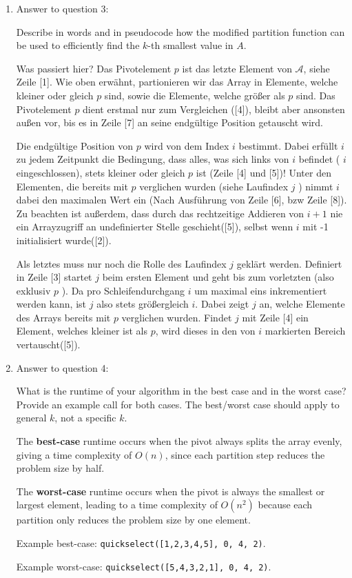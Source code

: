 \documentclass[11pt]{article}
\begin{document}
\begin{enumerate}
	\item Answer to question 3:

	      Describe in words and in pseudocode how the modified partition function can be used to efficiently find the $k$-th smallest value in $A$.

	      Was passiert hier? Das Pivotelement $p$ ist das letzte Element von $\mathcal{A}$, siehe Zeile [1]. Wie oben erwähnt, partionieren wir das Array in Elemente, welche kleiner oder gleich $p$ sind, sowie die Elemente, welche größer als $p$ sind. Das Pivotelement $p$ dient erstmal nur zum Vergleichen ([4]), bleibt aber ansonsten außen vor, bis es in Zeile [7] an seine endgültige Position getauscht wird.

	      Die endgültige Position von $p$ wird von dem Index $i$ bestimmt. Dabei erfüllt $i$ zu jedem Zeitpunkt die Bedingung, dass alles, was sich links von $i$ befindet ( $i$ eingeschlossen), stets kleiner oder gleich $p$ ist (Zeile [4] und [5])! Unter den Elementen, die bereits mit $p$ verglichen wurden (siehe Laufindex $j$ ) nimmt $i$ dabei den maximalen Wert ein (Nach Ausführung von Zeile [6], bzw Zeile [8]). Zu beachten ist außerdem, dass durch das rechtzeitige Addieren von $i+1$ nie ein Arrayzugriff an undefinierter Stelle geschieht([5]), selbst wenn $i$ mit -1 initialisiert wurde([2]).

	      Als letztes muss nur noch die Rolle des Laufindex $j$ geklärt werden. Definiert in Zeile [3] startet $j$ beim ersten Element und geht bis zum vorletzten (also exklusiv $p$ ). Da pro Schleifendurchgang $i$ um maximal eins inkrementiert werden kann, ist $j$ also stets größergleich $i$. Dabei zeigt $j$ an, welche Elemente des Arrays bereits mit $p$ verglichen wurden. Findet $j$ mit Zeile [4] ein Element, welches kleiner ist als $p$, wird dieses in den von $i$ markierten Bereich vertauscht([5]).



	\item Answer to question 4:

	      What is the runtime of your algorithm in the best case and in the worst case? Provide an example call for both cases. The best/worst case should apply to general $k$, not a specific $k$.

	      The \textbf{best-case} runtime occurs when the pivot always splits the array evenly, giving a time complexity of $O(n)$, since each partition step reduces the problem size by half.

	      The \textbf{worst-case} runtime occurs when the pivot is always the smallest or largest element, leading to a time complexity of $O(n^2)$ because each partition only reduces the problem size by one element.

	      Example best-case: \texttt{quickselect([1,2,3,4,5], 0, 4, 2)}.

	      Example worst-case: \texttt{quickselect([5,4,3,2,1], 0, 4, 2)}.

\end{enumerate}
\end{document}
